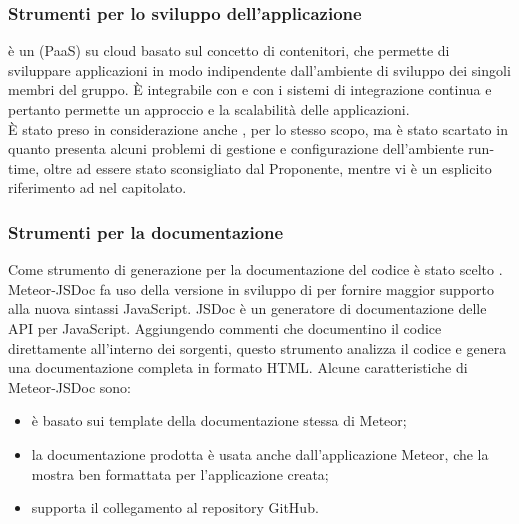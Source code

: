 \subsubsection{Strumenti per lo sviluppo dell'applicazione}
\textbf{} è un  (PaaS) su cloud basato sul concetto di contenitori, che permette di sviluppare applicazioni in modo indipendente dall'ambiente di sviluppo dei singoli membri del gruppo. \`{E} integrabile con  e con i sistemi di integrazione continua e pertanto permette un approccio  e la scalabilità delle applicazioni.\\
\`{E} stato preso in considerazione anche , per lo stesso scopo, ma è stato scartato in quanto presenta alcuni problemi di gestione e configurazione dell'ambiente run-time, oltre ad essere stato sconsigliato dal Proponente, mentre vi è un esplicito riferimento ad  nel capitolato.

\subsubsection{Strumenti per la documentazione}
Come strumento di generazione per la documentazione del codice è stato scelto \textbf{}.\\
Meteor-JSDoc fa uso della versione in sviluppo di \textbf{} per fornire maggior supporto alla nuova sintassi JavaScript.
JSDoc è un generatore di documentazione delle API per JavaScript. Aggiungendo commenti che documentino il codice direttamente all'interno dei sorgenti, questo strumento analizza il codice e genera una documentazione completa in formato HTML.
Alcune caratteristiche di Meteor-JSDoc sono:
\begin{itemize}
	\item è basato sui template della documentazione stessa di Meteor;
	\item la documentazione prodotta è usata anche dall'applicazione Meteor, che la mostra ben formattata per l'applicazione creata;
	\item supporta il collegamento al repository GitHub.
\end{itemize}

